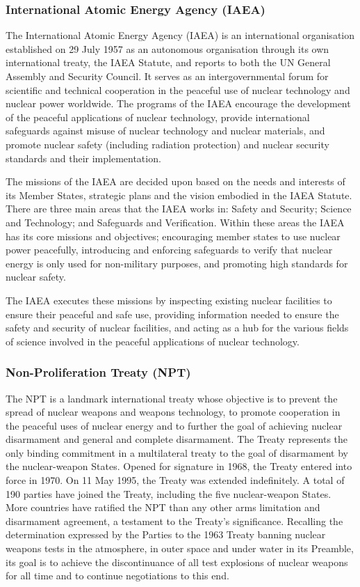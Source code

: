 \documentclass[twoside,titlepage,11pt,twocolumn,a4paper]{article}
\begin{document}
\subsubsection{International Atomic Energy Agency (IAEA)}
The International Atomic Energy Agency (IAEA) is an international
organisation established on 29 July 1957 as an autonomous organisation
through its own international treaty, the IAEA Statute, and reports to
both the UN General Assembly and Security Council. It serves as an
intergovernmental forum for scientific and technical cooperation in
the peaceful use of nuclear technology and nuclear power
worldwide. The programs of the IAEA encourage the development of the
peaceful applications of nuclear technology, provide international
safeguards against misuse of nuclear technology and nuclear materials,
and promote nuclear safety (including radiation protection) and
nuclear security standards and their implementation.

The missions of the IAEA are decided upon based on the needs and
interests of its Member States, strategic plans and the vision
embodied in the IAEA Statute. There are three main areas that the IAEA
works in: Safety and Security; Science and Technology; and Safeguards
and Verification. Within these areas the IAEA has its core missions
and objectives; encouraging member states to use nuclear power
peacefully, introducing and enforcing safeguards to verify that
nuclear energy is only used for non-military purposes, and promoting
high standards for nuclear safety.

The IAEA executes these missions by inspecting existing nuclear
facilities to ensure their peaceful and safe use, providing
information needed to ensure the safety and security of nuclear
facilities, and acting as a hub for the various fields of science
involved in the peaceful applications of nuclear technology.

\subsubsection{Non-Proliferation Treaty (NPT)}
The NPT is a landmark international treaty whose objective is to
prevent the spread of nuclear weapons and weapons technology, to
promote cooperation in the peaceful uses of nuclear energy and to
further the goal of achieving nuclear disarmament and general and
complete disarmament. The Treaty represents the only binding
commitment in a multilateral treaty to the goal of disarmament by the
nuclear-weapon States. Opened for signature in 1968, the Treaty
entered into force in 1970. On 11 May 1995, the Treaty was extended
indefinitely. A total of 190 parties have joined the Treaty, including
the five nuclear-weapon States. More countries have ratified the NPT
than any other arms limitation and disarmament agreement, a testament
to the Treaty's significance. Recalling the determination expressed by
the Parties to the 1963 Treaty banning nuclear weapons tests in the
atmosphere, in outer space and under water in its Preamble, its goal
is to achieve the discontinuance of all test explosions of nuclear
weapons for all time and to continue negotiations to this end.
\end{document}
